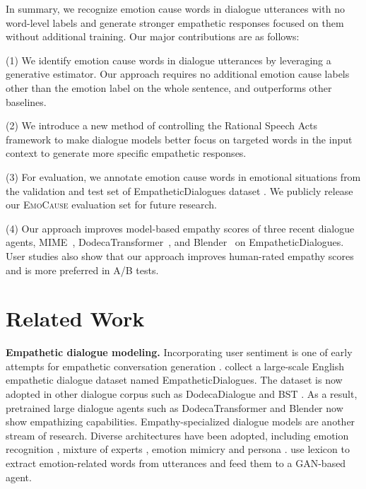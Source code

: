 \documentclass[11pt]{article}
\begin{document}
In summary, we recognize emotion cause words in dialogue utterances with no word-level labels and generate stronger empathetic responses focused on them without additional training.
Our major contributions are as follows:

(1) We identify emotion cause words in dialogue utterances by leveraging a generative estimator.
Our approach requires no additional emotion cause labels other than the emotion label on the whole sentence, and outperforms other baselines.


(2) We introduce a new method of controlling the Rational Speech Acts framework \citep{Frank:2012:Science}
to make dialogue models better focus on targeted words in the input context to generate more specific empathetic responses.

(3) For evaluation, we annotate emotion cause words in emotional situations from the validation and test set of EmpatheticDialogues dataset \citep{Rashkin:2019:ACL}.
We publicly release our \textsc{EmoCause} evaluation set for future research.

(4) Our approach improves model-based empathy scores \citep{Sharma:2020:EMNLP} of three recent dialogue agents,
MIME~\citep{Majumder:2020:EMNLP}, DodecaTransformer~\citep{Shuster:2020:ACL}, and Blender~\citep{Roller:2021:EACL} on EmpatheticDialogues.
User studies also show that our approach improves human-rated empathy scores and is more preferred in A/B tests.








\section{Related Work}
\label{sec:related_work}

\textbf{Empathetic dialogue modeling.}
Incorporating user sentiment is one of early attempts for empathetic conversation generation \citep{Siddique:2017:ACL, Shi:2018:ACL}.
\citet{Rashkin:2019:ACL} collect a large-scale English empathetic dialogue dataset named EmpatheticDialogues. The dataset is now adopted in other dialogue corpus such as DodecaDialogue \citep{Shuster:2020:ACL} and BST \citep{Smith:2020:ACL}.
As a result, pretrained large dialogue agents such as DodecaTransformer \citep{Shuster:2020:ACL} and Blender \citep{Roller:2021:EACL} now show empathizing capabilities.
Empathy-specialized dialogue models are another stream of research.
Diverse architectures have been adopted, including emotion recognition \citep{Lin:2020:AAAI}, mixture of experts \citep{Lin:2019:EMNLP}, emotion mimicry \citep{Majumder:2020:EMNLP} and persona \citep{Zhong:2020:EMNLP}.
\citet{Li:2020:COLING} use lexicon to extract emotion-related words from utterances and feed them to a GAN-based agent.
\end{document}
